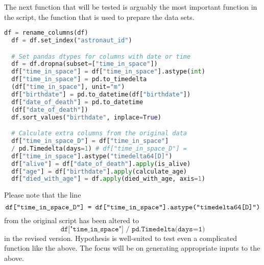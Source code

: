 \documentclass[runningheads]{llncs}
\begin{document}
The next function that will be tested is arguably the most important function in the script, the function that is used to prepare the data sets.

\begin{lstlisting}[language=Python]
  df = rename_columns(df)
  df = df.set_index("astronaut_id")

  # Set pandas dtypes for columns with date or time
  df = df.dropna(subset=["time_in_space"])
  df["time_in_space"] = df["time_in_space"].astype(int)
  df["time_in_space"] = pd.to_timedelta
  (df["time_in_space"], unit="m")
  df["birthdate"] = pd.to_datetime(df["birthdate"])
  df["date_of_death"] = pd.to_datetime
  (df["date_of_death"])
  df.sort_values("birthdate", inplace=True)

  # Calculate extra columns from the original data
  df["time_in_space_D"] = df["time_in_space"] 
  / pd.Timedelta(days=1) # df["time_in_space_D"] = 
  df["time_in_space"].astype("timedelta64[D]")
  df["alive"] = df["date_of_death"].apply(is_alive)
  df["age"] = df["birthdate"].apply(calculate_age)
  df["died_with_age"] = df.apply(died_with_age, axis=1)
\end{lstlisting}

Please note that the line
\begin{equation}
  \texttt{df["time\_in\_space\_D"] = \allowbreak
    df["time\_in\_space"].astype("timedelta64[D]")}
\end{equation}
from the original script has been altered to
\begin{equation}
  \texttt{df["time\_in\_space"] / pd.Timedelta(days=1)}
\end{equation}
in the revised version. Hypothesis is well-suited to test even a complicated function like the above. The focus will be on generating appropriate inputs to the above.
\end{document}
